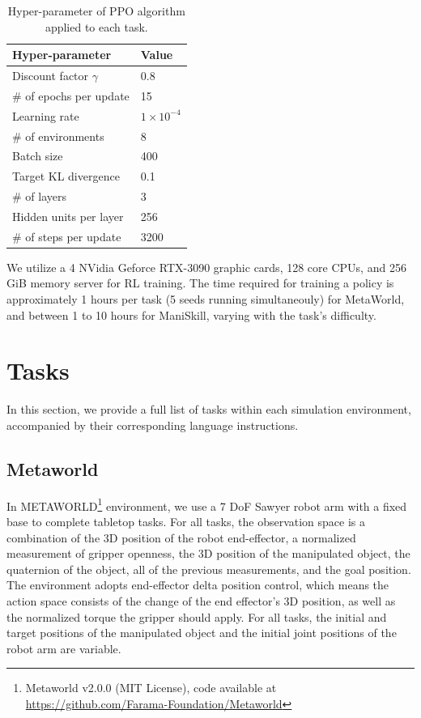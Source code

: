\begin{table}[h]
\centering
\caption{Hyper-parameter of PPO algorithm applied to each task.}
\label{tab:ppo-hyperparameters}
\begin{tabular}{ll}
\toprule
\textbf{Hyper-parameter}         & \textbf{Value}                                              \\
\midrule
Discount factor \( \gamma \)     & 0.8                        \\
\# of epochs per update          & 15                           \\
Learning rate                    & \( 1 \times 10^{-4} \)                                      \\
\# of environments               & 8                                                          \\
Batch size                       & 400                              \\
Target KL divergence             & 0.1                           \\
\# of layers                      & 3                                                         \\
Hidden units per layer           & 256                                                        \\
\# of steps per update           & 3200                        \\
\bottomrule
\end{tabular}
\end{table}

We utilize a 4 NVidia Geforce RTX-3090 graphic cards, 128 core CPUs, and 256 GiB memory server for RL training. The time required for training a policy is approximately 1 hours per task (5 seeds running simultaneouly) for MetaWorld, and between 1 to 10 hours for ManiSkill, varying with the task’s difficulty.

\section{Tasks}\label{app:tasks}
In this section, we provide a full list of tasks within each simulation environment, accompanied by their corresponding language instructions.
\subsection{Metaworld}
In METAWORLD\cite{yu2019meta}\footnote{Metaworld v2.0.0 (MIT License), code available at \url{https://github.com/Farama-Foundation/Metaworld}} environment, we use a 7 DoF Sawyer robot arm with a fixed base to complete tabletop tasks. For all tasks, the observation space is a combination of the 3D position of the robot end-effector, a normalized measurement of gripper openness, the 3D position of the manipulated object, the quaternion of the object, all of the previous measurements, and the goal position. The environment adopts end-effector delta position control, which means the action space consists of the change of the end effector’s 3D position, as well as the normalized torque the gripper should apply. For all tasks, the initial and target positions of the manipulated object and the initial joint positions of the robot arm are variable.

